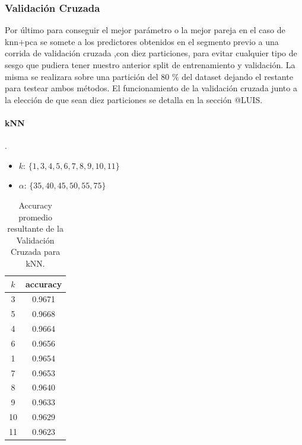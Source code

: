 \subsubsection{Validación Cruzada}

Por último para conseguir el mejor parámetro o la mejor pareja en el caso de knn+pca se somete a los predictores obtenidos en el segmento previo a una corrida de validación cruzada ,con diez particiones, para evitar cualquier tipo de sesgo que pudiera tener nuestro anterior split de entrenamiento y validación. La misma se realizara sobre una partición del 80 $\%$ del dataset dejando el restante para testear ambos métodos.
El funcionamiento de la validación cruzada junto a la elección de que sean diez particiones se detalla en la sección @LUIS.

\paragraph{kNN}.

\begin{itemize}
    \item \textbf{$k$}: $ \{1,3,4,5,6,7,8,9,10,11\}$
    \item \textbf{$\alpha$}: $\{  35, 40, 45, 50, 55, 75 \}$
\end{itemize}
\begin{table}[h!]
    \begin{center}
        \begin{tabular}{|c|c|}
        \hline
        \textbf{$k$} & \textbf{accuracy} \\
        \hline
        3 &  0.9671\\
        5 & 0.9668\\
        4 & 0.9664\\
        6 & 0.9656\\
        1 &  0.9654\\
        7 & 0.9653\\
        8 & 0.9640\\
        9 & 0.9633\\
        10 & 0.9629\\
        11 & 0.9623\\
        
        \hline
        \end{tabular}
        \caption{Accuracy promedio resultante de la Validación Cruzada para kNN.}
        \label{knn_crossVal_table}
    \end{center}
\end{table}

